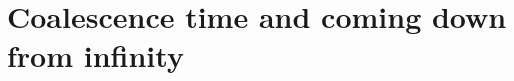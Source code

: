 \documentclass[11pt,a4paper]{scrartcl}
\numberwithin{equation}{section}
\theoremstyle{plain}
\theoremstyle{definition}
\theoremstyle{remark}
\newcommand{\bN}{\ensuremath{\mathbb{N}}}
\newcommand{\cC}{\ensuremath{\mathcal{C}}}
\begin{document}
\section{Coalescence time and coming down from infinity}
%
\end{document}
